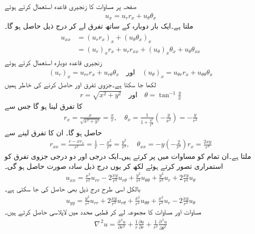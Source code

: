 صفحہ   پر مساوات  کا زنجیری قاعدہ استعمال کرتے ہوئے
\begin{align*}
u_x=u_r r_x+u_{\theta}\theta_x
\end{align*}
ملتا ہے۔ایک بار دوبارہ  کے ساتھ تفرق لے کر درج ذیل حاصل ہو گا۔
\begin{gather}
\begin{aligned}\label{مساوات_جزوی_لاپلاسی__رکن_الف}
u_{xx}&=(u_r r_x)_x+(u_{\theta}\theta_x)_x\\
&=(u_r)_xr_x+u_rr_{xx}+(u_{\theta})_x\theta_x+u_{\theta}\theta_{xx}
\end{aligned}
\end{gather}
زنجیری قاعدہ دوبارہ استعمال کرتے ہوئے
\begin{align*}
(u_r)_x=u_{rr}r_x+u_{r\theta}\theta_x\quad \text{اور}\quad (u_{\theta})_x=u_{\theta r}r_x+u_{\theta \theta} \theta_x
\end{align*}
لکھا جا سکتا ہے۔جزوی تفرق  اور  حاصل کرنے کی خاطر ہمیں
\begin{align*}
r=\sqrt{x^2+y^2}\quad \text{اور}\quad \theta=\tan^{-1}\frac{y}{x}
\end{align*}
کا تفرق لینا ہو گا جس سے 
\begin{align*}
r_x=\frac{x}{\sqrt{x^2+y^2}}=\frac{x}{r}, \quad \theta_x=\frac{1}{1+\frac{y^2}{x^2}}\left(-\frac{y}{x^2}\right)=-\frac{y}{r^2}
\end{align*}
حاصل ہو گا۔ ان کا  تفرق لینے سے
\begin{align*}
r_{xx}=\frac{r-xr_x}{r^2}=\frac{1}{r}-\frac{x^2}{r^3}=\frac{y^2}{r^3},\quad \theta_{xx}=-y\left(-\frac{2}{r^3}\right)r_x=\frac{2xy}{r^4}
\end{align*}
ملتا ہے۔ان تمام کو مساوات  میں پر کرتے ہیں۔ایک درجی اور دو درجی جزوی تفرق کو استمراری تصور کرتے ہوئے  لکھ کر یوں درج ذیل سادہ صورت حاصل ہو گی۔
 \begin{align}\label{مساوات_جزوی_لاپلاسی__رکن_ب}
u_{xx}=\frac{x^2}{r^2}u_{rr}-2\frac{xy}{r^3}u_{r\theta}+\frac{y^2}{r^4}u_{\theta\theta}+\frac{y^2}{r^3}u_r+2\frac{xy}{r^4}u_{\theta}
\end{align}
بالکل اسی طرح درج ذیل بھی حاصل کی جا سکتی ہے۔
\begin{align}\label{مساوات_جزوی_لاپلاسی__رکن_پ}
u_{yy}=\frac{y^2}{r^2}u_{rr}+2\frac{xy}{r^3}u_{r\theta}+\frac{x^2}{r^4}u_{\theta\theta}+\frac{x^2}{r^3}u_r-2\frac{xy}{r^4}u_{\theta}
\end{align}
مساوات  اور مساوات  کا مجموعہ لے کر قطبی محدد میں لاپلاسی حاصل کرتے ہیں۔
\begin{align}\label{مساوات_جزوی_لاپلاسی__رکن_ت}
\nabla^{\,2}u=\frac{\partial^{\,2}u}{\partial r^2}+\frac{1}{r}\frac{\partial u}{\partial r}+\frac{1}{r^2}\frac{\partial^{\,2}u}{\partial \theta^2}
\end{align}


